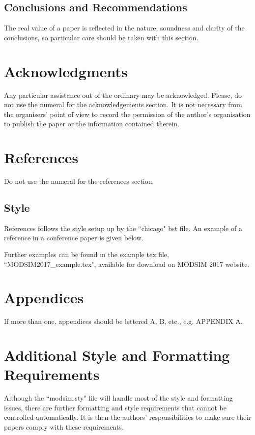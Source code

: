\documentclass[a4paper,fleqn]{article} %
\begin{document}
\subsection{Conclusions and Recommendations}

The real value of a paper is reflected in the nature, soundness and clarity of the conclusions, so particular care should be taken with this section.

\section*{Acknowledgments}
Any particular assistance out of the ordinary may be acknowledged.  Please, do not use the numeral for the acknowledgements section. It is not necessary from the organisers' point of view to record the permission of the author's organisation to publish the paper or the information contained therein.

\section*{References}
Do not use the numeral for the references section.

\subsection*{Style}
References follows the style setup up by the ``chicago" bst file. An example of a reference in a conference paper is given below.




\noindent Further examples can be found in the example tex file, ``MODSIM2017\_example.tex", available for download on MODSIM 2017 website.

\section*{Appendices}
If more than one, appendices should be lettered A, B, etc., e.g.  APPENDIX A.

\section{Additional Style and Formatting Requirements}

Although the ``modsim.sty" file will handle most of the style and formatting issues, there are further formatting and style requirements that cannot be controlled automatically. It is then the authors' responsibilities to make sure their papers comply with these requirements.
\end{document}
